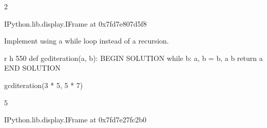 \documentclass[letterpaper,10pt,english]{sphinxmanual}
\begin{document}
\begin{sphinxVerbatim}[commandchars=\\\{\}]
2
\end{sphinxVerbatim}

\begin{sphinxVerbatim}[commandchars=\\\{\}]
\PYGZlt{}IPython.lib.display.IFrame at 0x7fd7e807d5f8\PYGZgt{}
\end{sphinxVerbatim}

\begin{sphinxVerbatim}[commandchars=\\\{\}]
   
       
\end{sphinxVerbatim}

 Implement  using a while loop instead of a recursion.

\begin{sphinxVerbatim}[commandchars=\\\{\}]
 \PYGZhy{}r \PYGZhy{}h 550
def gcd\PYGZus{}iteration(a, b):
    \PYGZsh{}\PYGZsh{}\PYGZsh{} BEGIN SOLUTION
    while b:
        a, b = b, a \PYGZpc{} b
    return a
    \PYGZsh{}\PYGZsh{}\PYGZsh{} END SOLUTION


gcd\PYGZus{}iteration(3 * 5, 5 * 7)
\end{sphinxVerbatim}

\begin{sphinxVerbatim}[commandchars=\\\{\}]
5
\end{sphinxVerbatim}

\begin{sphinxVerbatim}[commandchars=\\\{\}]
\PYGZlt{}IPython.lib.display.IFrame at 0x7fd7e27fc2b0\PYGZgt{}
\end{sphinxVerbatim}

\begin{sphinxVerbatim}[commandchars=\\\{\}]
   
       
\end{sphinxVerbatim}
\end{document}
